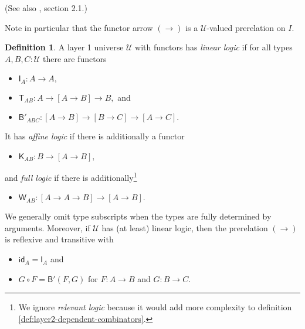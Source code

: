 \documentclass[a4paper]{article}
\theoremstyle{definition}
\newtheorem{definition}{Definition}[section]
\theoremstyle{remark}
\newcommand{\defn}{\emph}
\newcommand{\U}{\mathcal{U}}
\newcommand{\nm}{\mathsf}
\newcommand{\id}{\nm{id}}
\newcommand{\combinator}{\nm}
\newcommand{\idFun}{\combinator{I}}
\newcommand{\revAppFun}{\combinator{T}}
\newcommand{\constFun}{\combinator{K}}
\newcommand{\compFun}{\combinator{B'}}
\newcommand{\dupFun}{\combinator{W}}
\begin{document}
(See also \cite{hottbook}, section 2.1.)

Note in particular that the functor arrow $(\to)$ is a $\U$-valued prerelation on $I.$

\begin{definition}
  \label{def:layer1-combinators}
  A layer 1 universe $\U$ with functors has \defn{linear logic} if for all types $A,B,C : \U$ there
  are functors
  \begin{itemize}
    \item $\idFun_A : A \to A,$
    \item $\revAppFun_{AB} : A \to [A \to B] \to B,$ and
    \item $\compFun_{ABC} : [A \to B] \to [B \to C] \to [A \to C].$
  \end{itemize}
  It has \defn{affine logic} if there is additionally a functor
  \begin{itemize}
    \item $\constFun_{AB} : B \to [A \to B],$
  \end{itemize}
  and \defn{full logic} if there is additionally\footnote{We ignore \defn{relevant logic} because it
  would add more complexity to definition \ref{def:layer2-dependent-combinators}.}
  \begin{itemize}
    \item $\dupFun_{AB} : [A \to A \to B] \to [A \to B].$
  \end{itemize}

  We generally omit type subscripts when the types are fully determined by arguments. Moreover,
  if $\U$ has (at least) linear logic, then the prerelation $(\to)$ is reflexive and transitive with
  \begin{itemize}
    \item $\id_A = \idFun_A$ and
    \item $G \circ F = \compFun(F,G)$ for $F : A \to B$ and $G : B \to C.$
  \end{itemize}
\end{definition}
\end{document}
